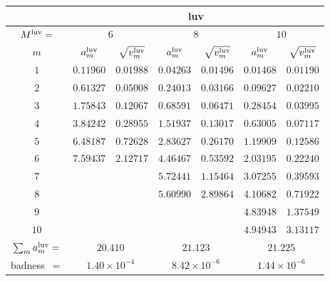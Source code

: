 \begin{tabular}{c|cc|cc|cc|}
&
\multicolumn{6}{|c|}{luv} \\
\hline
$M^{\mathrm{luv}}=$ &
 \multicolumn{2}{|c|}{$6$} &
 \multicolumn{2}{|c|}{$8$} &
 \multicolumn{2}{|c|}{$10$} \\
$m$ &
 $a^{\mathrm{luv}}_m$ & $\sqrt{v^{\mathrm{luv}}_m}$ &
 $a^{\mathrm{luv}}_m$ & $\sqrt{v^{\mathrm{luv}}_m}$ &
 $a^{\mathrm{luv}}_m$ & $\sqrt{v^{\mathrm{luv}}_m}$ \\
$1$ &
 $0.11960$ & $0.01988$ &
 $0.04263$ & $0.01496$ &
 $0.01468$ & $0.01190$ \\
$2$ &
 $0.61327$ & $0.05008$ &
 $0.24013$ & $0.03166$ &
 $0.09627$ & $0.02210$ \\
$3$ &
 $1.75843$ & $0.12067$ &
 $0.68591$ & $0.06471$ &
 $0.28454$ & $0.03995$ \\
$4$ &
 $3.84242$ & $0.28955$ &
 $1.51937$ & $0.13017$ &
 $0.63005$ & $0.07117$ \\
$5$ &
 $6.48187$ & $0.72628$ &
 $2.83627$ & $0.26170$ &
 $1.19909$ & $0.12586$ \\
$6$ &
 $7.59437$ & $2.12717$ &
 $4.46467$ & $0.53592$ &
 $2.03195$ & $0.22240$ \\
$7$ &
 $~$ & $~$ &
 $5.72441$ & $1.15464$ &
 $3.07255$ & $0.39593$ \\
$8$ &
 $~$ & $~$ &
 $5.60990$ & $2.89864$ &
 $4.10682$ & $0.71922$ \\
$9$ &
 $~$ & $~$ &
 $~$ & $~$ &
 $4.83948$ & $1.37549$ \\
$10$ &
 $~$ & $~$ &
 $~$ & $~$ &
 $4.94943$ & $3.13117$ \\
\hline
$\sum_m a^{\mathrm{luv}}_m=$ &
 \multicolumn{2}{|c|}{$20.410$} &
 \multicolumn{2}{|c|}{$21.123$} &
 \multicolumn{2}{|c|}{$21.225$} \\
badness~$=$ &
 \multicolumn{2}{|c|}{$1.40\times 10^{-4}$} &
 \multicolumn{2}{|c|}{$8.42\times 10^{-6}$} &
 \multicolumn{2}{|c|}{$1.44\times 10^{-6}$} \\
\end{tabular}
